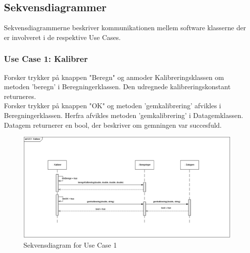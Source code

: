 \subsection{Sekvensdiagrammer}
Sekvensdiagrammerne beskriver kommunikationen mellem software klasserne der er involveret i de respektive Use Cases.\\

\subsubsection{Use Case 1: Kalibrer}
Forsker trykker på knappen "Beregn" og anmoder Kalibreringsklassen om metoden 'beregn' i Beregningerklassen. Den udregnede kalibreringskonstant returneres.\\
Forsker trykker på knappen "OK" og metoden 'gemkalibrering' afvikles i Beregningerklassen. Herfra afvikles metoden 'gemkalibrering' i Datagemklassen. Datagem returnerer en bool, der beskriver om gemningen var succesfuld.
\begin{figure}[H]
	\centering
	\includegraphics[width=1\textwidth]{Figurer/UC1_SD_SW}
	\caption{Sekvensdiagram for Use Case 1}
\end{figure}

